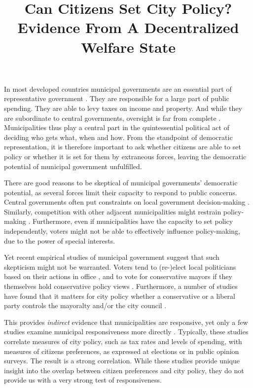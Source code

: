 \documentclass[a4paper,12pt]{article}
\title{\bigskip \bigskip \sffamily \LARGE{Can Citizens Set City Policy?} \\ \Large{ Evidence From A Decentralized Welfare State}}
\begin{document}
\noindent In most developed countries municipal governments are an essential part of representative government \citep{trounstine2009all,kersting2013reforming}. They are responsible for a large part of public spending.  They are able to levy taxes on income and property. And while they are subordinate to central governments, oversight is far from complete \citep{oecd2016subnational}. Municipalities thus play a central part in the quintessential political act of deciding who gets what, when and how. From the standpoint of democratic representation, it is therefore important to ask whether citizens are able to set policy or whether it is set for them by extraneous forces, leaving the democratic potential of municipal government unfulfilled.


There are good reasons to be skeptical of municipal governments' democratic potential, as several forces limit their capacity to respond to public concerns. Central governments often put constraints on local government decision-making \citep{peterson1981city}. Similarly, competition with other adjacent municipalities might restrain policy-making \citep{salmon2006horizontal}. Furthermore, even if municipalities have the capacity to set policy independently, voters might not be able to effectively influence policy-making, due to the power of special interests. 


Yet recent empirical studies of municipal government suggest that such skepticism might not be warranted. Voters tend to (re-)elect local politicians based on their actions in office \citep[e.g.,][]{boyne2009democracy,larsen2018relationship}, and to vote for conservative  mayors if they themselves hold conservative policy views  \citep{sances2017ideology,boudreau2015lost,hopkins2017retrospective}. Furthermore, a number of studies have found that it matters for city policy whether a conservative or a liberal party controls the mayoralty and/or the city council \citep[e.g.,][]{fiva2018power,blom2006parties,de2016mayoral}.  

This provides \textit{indirect} evidence that municipalities are responsive, yet only a few studies examine municipal responsiveness more directly \citep{tausanovitch2014representation,hajnal2010or,palus2010responsiveness,einstein2016pushing}. Typically, these studies correlate measures of city policy, such as tax rates and levels of spending, with measures of citizens preferences, as expressed at elections or in public opinion surveys. The result is  a strong correlation. While these studies provide unique insight into the overlap between citizen preferences and city policy, they do not provide us with a very strong test of responsiveness. 
\end{document}
